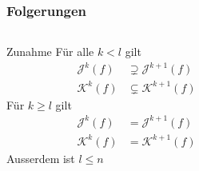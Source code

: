 %
%
%
\begin{frame}[t]
\frametitle{Folgerungen}
\begin{columns}[t]
\begin{column}{0.48\textwidth}
\begin{block}{Zunahme}
Für alle $k<l$ gilt
\begin{align*}
\mathcal{J}^k(f) &\supsetneq \mathcal{J}^{k+1}(f)
\\
\mathcal{K}^k(f) &\subsetneq \mathcal{K}^{k+1}(f)
\end{align*}
Für $k\ge l$ gilt
\begin{align*}
\mathcal{J}^k(f) &= \mathcal{J}^{k+1}(f)
\\
\mathcal{K}^k(f) &= \mathcal{K}^{k+1}(f)
\end{align*}
Ausserdem ist $l\le n$
\end{block}
\end{column}
\begin{column}{0.48\textwidth}
\begin{block}{}
\end{block}
\end{column}
\end{columns}
\end{frame}
